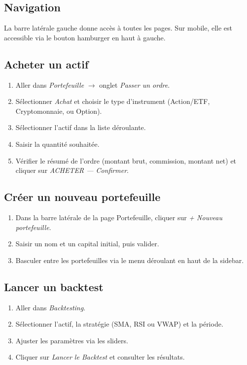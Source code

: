\documentclass[a4paper, 12pt, twoside]{article}
\begin{document}
    \subsection*{Navigation}

    La barre latérale gauche donne accès à toutes les pages. Sur mobile, elle
    est accessible via le bouton hamburger en haut à gauche.

    \subsection*{Acheter un actif}
    \begin{enumerate}
        \item Aller dans \textit{Portefeuille} $\to$ onglet
              \textit{Passer un ordre}.
        \item Sélectionner \textit{Achat} et choisir le type d'instrument
              (Action/ETF, Cryptomonnaie, ou Option).
        \item Sélectionner l'actif dans la liste déroulante.
        \item Saisir la quantité souhaitée.
        \item Vérifier le résumé de l'ordre (montant brut, commission,
              montant net) et cliquer sur \textit{ACHETER --- Confirmer}.
    \end{enumerate}

    \subsection*{Créer un nouveau portefeuille}
    \begin{enumerate}
        \item Dans la barre latérale de la page Portefeuille, cliquer sur
              \textit{+ Nouveau portefeuille}.
        \item Saisir un nom et un capital initial, puis valider.
        \item Basculer entre les portefeuilles via le menu déroulant en
              haut de la sidebar.
    \end{enumerate}

    \subsection*{Lancer un backtest}
    \begin{enumerate}
        \item Aller dans \textit{Backtesting}.
        \item Sélectionner l'actif, la stratégie (SMA, RSI ou VWAP) et la
              période.
        \item Ajuster les paramètres via les sliders.
        \item Cliquer sur \textit{Lancer le Backtest} et consulter les
              résultats.
    \end{enumerate}
\end{document}
